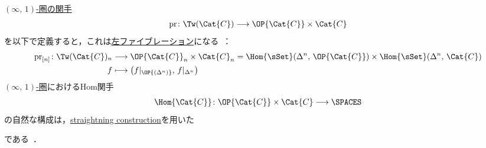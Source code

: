 \documentclass[TQFT_main]{subfiles}
\begin{document}
\hyperref[def:infinity-1]{$(\infty,\, 1)$-圏の関手} 
\begin{align}
    \mathrm{pr} \colon \Tw(\Cat{C}) \lto \OP{\Cat{C}} \times \Cat{C}
\end{align}
を以下で定義すると，これは\hyperref[def:infty-fib]{左ファイブレーション}になる~\cite[\href{https://kerodon.net/tag/03JQ}{Tag 03JQ}]{kerodon}：
\begin{align}
    \mathrm{pr}_{[n]} \colon \Tw(\Cat{C})_n &\lto \OP{\Cat{C}}_n \times \Cat{C}_n = \Hom{\sSet}(\Delta^n,\, \OP{\Cat{C}}) \times \Hom{\sSet}(\Delta^n,\, \Cat{C}) \\
    f &\lmto \bigl( f|_{\OP{(\Delta^n)}},\, f|_{\Delta^n} \bigr) 
\end{align}
\hyperref[def:infinity-1]{$(\infty,\, 1)$-圏}におけるHom関手
\begin{align}
    \Hom{\Cat{C}} \colon \OP{\Cat{C}} \times \Cat{C} \lto \SPACES
\end{align}
の自然な構成は，\hyperref[thm:unstraightening]{straightning construction}を用いた
\begin{center}
\end{center}
である~\cite[I.26., p.19]{Hebestreit2020K-theory}．
\end{document}
